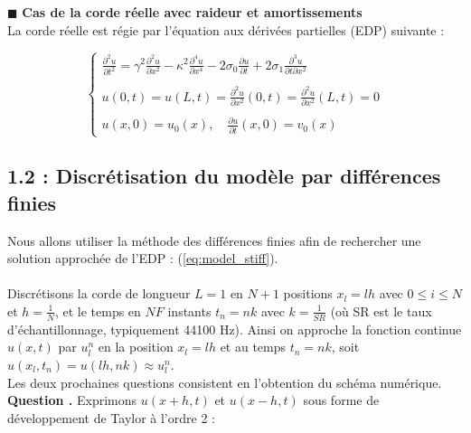 \documentclass[a4,12pt]{article}
\newcounter{Nbquestion}
\newcommand*\question{%
  \stepcounter{Nbquestion}%
  \textbf{Question \theNbquestion. }}
\begin{document}

	  \indent $\blacksquare$ \textbf{Cas de la corde réelle avec raideur et amortissements}\\

	  La corde réelle est régie par l'équation aux dérivées partielles (EDP) suivante :

	  \begin{equation} 
	    \left\{
	      \begin{array}{l}
		\displaystyle \frac{\partial^2 u}{\partial t^2}=\gamma^2 \frac{\partial^2 u}{\partial x^2}-\kappa^2  				\frac{\partial^4 u}{\partial x^4}-2\sigma_0  \frac{\partial u}{\partial t}+2\sigma_1  \frac{\partial^3 u}{\partial t		\partial x^2}\\ \\ 
		\displaystyle u(0,t)=u(L,t)=\frac{\partial^2 u}{\partial x^2}(0,t)=\frac{\partial^2 u}{\partial x^2}(L,t)=0\\ \\  		\displaystyle u(x,0)=u_0(x), \quad \frac{\partial u}{\partial t}(x,0)=v_0(x)
	      \end{array}
	      \right. 
	      \label{eq:model_stiff}
	    \end{equation}

	    \subsection*{1.2 : Discrétisation du modèle par différences finies}

	    Nous allons utiliser la méthode des différences finies afin de rechercher une solution approchée de l'EDP : (\ref{eq:model_stiff}).\\\\
	    Discrétisons la corde de longueur $L=1$ en $N+1$ positions $x_l=lh$ avec $0\leqslant i\leqslant N$ et $h=\frac{1}{N}$, et le temps en $NF$ instants $t_n=nk$ avec $k=\frac{1}{SR}$ (où SR est le taux d'échantillonnage, typiquement 44100 Hz). Ainsi on approche la fonction continue $u(x,t)$ par $u_l^n$ en la position $x_l=lh$ et au temps $t_n=nk$, soit $u(x_l,t_n)=u(lh,nk)\approx u_l^n$. \\

	    Les deux prochaines questions consistent en l'obtention du schéma numérique.\\


	    \question Exprimons $u(x+h,t)$ et $u(x-h,t)$ sous forme de développement de Taylor à l'ordre 2 :
\end{document}
